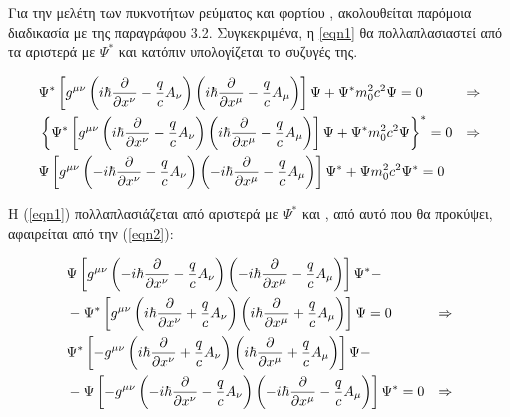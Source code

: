 Για την μελέτη των πυκνοτήτων ρεύματος και φορτίου , ακολουθείται παρόμοια  διαδικασία  με της παραγράφου 3.2. Συγκεκριμένα, η \ref{eqn1} θα πολλαπλασιαστεί από τα αριστερά με $\Psi^*$ και κατόπιν υπολογίζεται το συζυγές της. 

\begin{align}
 \notag &\Psi^* \left[  g^{\mu\nu} \left(  i \hbar\frac{\partial }{\partial x^\nu}-\frac{q}{c}A_\nu \right)  \left(  i \hbar\frac{\partial }{\partial x^\mu}-\frac{q}{c}A_\mu \right) \right]  \Psi + \Psi^* m_0^2 c^2 \Psi=0 &\Rightarrow
 \\\notag  &\left\{ \Psi^* \left[  g^{\mu\nu} \left(  i \hbar\frac{\partial }{\partial x^\nu}-\frac{q}{c}A_\nu \right)  \left(  i \hbar\frac{\partial }{\partial x^\mu}-\frac{q}{c}A_\mu \right) \right]  \Psi + \Psi^* m_0^2 c^2 \Psi \right\} ^*=0 &\Rightarrow
 \\  &\Psi \left[  g^{\mu\nu} \left(  -i \hbar\frac{\partial }{\partial x^\nu}-\frac{q}{c}A_\nu \right)  \left(  -i \hbar\frac{\partial }{\partial x^\mu}-\frac{q}{c}A_\mu \right) \right]  \Psi^* + \Psi m_0^2 c^2 \Psi^*=0 
 \label{eqn2}
\end{align}

Η (\ref{eqn1}) πολλαπλασιάζεται από αριστερά με $\Psi^*$ και , από αυτό που θα προκύψει, αφαιρείται από την (\ref{eqn2}): 


\begin{align*}
  &\Psi \left[  g^{\mu\nu} \left(  -i \hbar\frac{\partial }{\partial x^\nu}-\frac{q}{c}A_\nu \right)  \left(  -i \hbar\frac{\partial }{\partial x^\mu}-\frac{q}{c}A_\mu \right) \right]  \Psi^* -
  \\&- \Psi^* \left[  g^{\mu\nu} \left(  i \hbar\frac{\partial }{\partial x^\nu}+\frac{q}{c}A_\nu \right)  \left(  i \hbar\frac{\partial }{\partial x^\mu}+\frac{q}{c}A_\mu \right) \right]  \Psi =0 &\Rightarrow 
  \\& \Psi^* \left[  -g^{\mu\nu} \left(  i \hbar\frac{\partial }{\partial x^\nu}+\frac{q}{c}A_\nu \right)  \left(  i \hbar\frac{\partial }{\partial x^\mu}+\frac{q}{c}A_\mu \right) \right]  \Psi- 
  \\&-\Psi \left[  - g^{\mu\nu} \left(  -i \hbar\frac{\partial }{\partial x^\nu}-\frac{q}{c}A_\nu \right)  \left(  -i \hbar\frac{\partial }{\partial x^\mu}-\frac{q}{c}A_\mu \right) \right]  \Psi^* =0 &\Rightarrow  
\end{align*}
